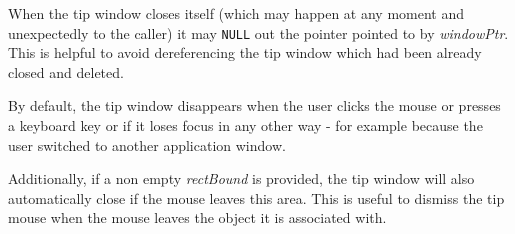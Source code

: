 When the tip window closes itself (which may happen at any moment and
unexpectedly to the caller) it may {\tt NULL} out the pointer pointed to by 
{\it windowPtr}. This is helpful to avoid dereferencing the tip window which
had been already closed and deleted.




By default, the tip window disappears when the user clicks the mouse or presses
a keyboard key or if it loses focus in any other way - for example because the
user switched to another application window.

Additionally, if a non empty {\it rectBound} is provided, the tip window will
also automatically close if the mouse leaves this area. This is useful to
dismiss the tip mouse when the mouse leaves the object it is associated with.



